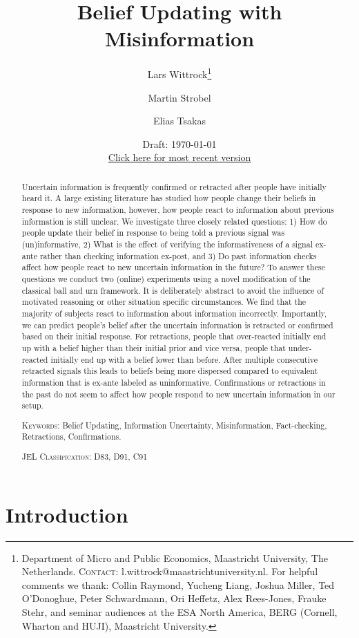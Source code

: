 \documentclass{article}
\title{Belief Updating with Misinformation}
\author{Lars Wittrock\thanks{\raggedright
    Department of Micro and Public Economics, Maastricht University, The Netherlands. 
    \linebreak \textsc{Contact:} l.wittrock@maastrichtuniversity.nl. 
    \linebreak For helpful comments we thank: Collin Raymond, Yucheng Liang, Joshua Miller, Ted O'Donoghue, Peter Schwardmann, Ori Heffetz, Alex Rees-Jones, Frauke Stehr,
    and seminar audiences at the ESA North America, BERG (Cornell, Wharton and HUJI), Maastricht University.
    }
\and Martin Strobel\samethanks[1]
\and Elias Tsakas\samethanks[1]}
\date{Draft: \today
\\
\href{http://www.larswittrock.eu/UpdatingMisinformation/UpdatingMisinformation.pdf}{Click here for most recent version}}
\begin{document}
\maketitle


\begin{abstract}
Uncertain information is frequently confirmed or retracted after people have initially heard it. A large existing literature has studied how people change their beliefs in response to new information, however, how people react to information about previous information is still unclear. We investigate three closely related questions: 1) How do people update their belief in response to being told a previous signal was (un)informative, 2) What is the effect of verifying the informativeness of a signal ex-ante rather than checking information  ex-post, and 3) Do past information checks affect how people react to new uncertain information in the future? To answer these questions we conduct two (online) experiments using a novel modification of the classical ball and urn framework. It is deliberately abstract to avoid the influence of motivated reasoning or other situation specific circumstances. We find that the majority of subjects react to information about information incorrectly. Importantly, we can predict people's belief after the uncertain information is retracted or confirmed based on their initial response. For retractions, people that over-reacted initially end up with a belief higher than their initial prior and vice versa, people that under-reacted initially end up with a belief lower than before. After multiple consecutive retracted signals this leads to beliefs being more dispersed compared to equivalent information that is ex-ante labeled as uninformative. Confirmations or retractions in the past do not seem to affect how people respond to new uncertain information in our setup.

\bigbreak
\noindent\textsc{Keywords:} Belief Updating, Information Uncertainty, Misinformation, Fact-checking, Retractions, Confirmations.

\noindent\textsc{JEL Classification:} D83, D91, C91
\end{abstract}


\newpage

\section{Introduction}
\end{document}
